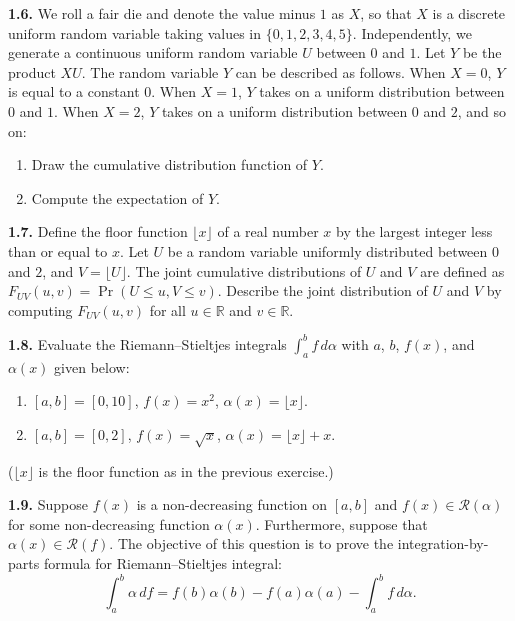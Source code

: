 \textbf{1.6.} We roll a fair die and denote the value minus $1$ as $X$, so that $X$ is a discrete uniform random variable taking values in $\{0,1,2,3,4,5\}$. Independently, we generate a continuous uniform random variable $U$ between $0$ and $1$. Let $Y$ be the product $XU$. The random variable $Y$ can be described as follows. When $X=0$, $Y$ is equal to a constant $0$. When $X=1$, $Y$ takes on a uniform distribution between $0$ and $1$. When $X=2$, $Y$ takes on a uniform distribution between $0$ and $2$, and so on:
\begin{enumerate}[label=(\alph*)]
    \item Draw the cumulative distribution function of $Y$.
    \item Compute the expectation of $Y$.
\end{enumerate}

\textbf{1.7.} Define the floor function $\lfloor x\rfloor$ of a real number $x$ by the largest integer less than or equal to $x$. Let $U$ be a random variable uniformly distributed between $0$ and $2$, and $V=\lfloor U\rfloor$. The joint cumulative distributions of $U$ and $V$ are defined as $F_{UV}(u,v)=\Pr(U\le u,V\le v)$. Describe the joint distribution of $U$ and $V$ by computing $F_{UV}(u,v)$ for all $u\in \mathbb{R}$ and $v\in \mathbb{R}$.

\textbf{1.8.} Evaluate the Riemann--Stieltjes integrals $\int_a^b f\, d\alpha$ with $a$, $b$, $f(x)$, and $\alpha(x)$ given below:
\begin{enumerate}[label=(\alph*)]
    \item $[a,b]=[0,10]$, $f(x)=x^2$, $\alpha(x)=\lfloor x\rfloor$.
    \item $[a,b]=[0,2]$, $f(x)=\sqrt{x}$, $\alpha(x)=\lfloor x\rfloor +x$.
\end{enumerate}

($\lfloor x\rfloor$ is the floor function as in the previous exercise.)

\textbf{1.9.} Suppose $f(x)$ is a non-decreasing function on $[a,b]$ and $f(x)\in \mathcal{R}(\alpha)$ for some non-decreasing function $\alpha(x)$. Furthermore, suppose that $\alpha(x)\in \mathcal{R}(f)$. The objective of this question is to prove the integration-by-parts formula for Riemann--Stieltjes integral:
\begin{equation}
\int_a^b \alpha\, df = f(b)\alpha(b)-f(a)\alpha(a)-\int_a^b f\, d\alpha.
\tag{1.7}
\end{equation}

